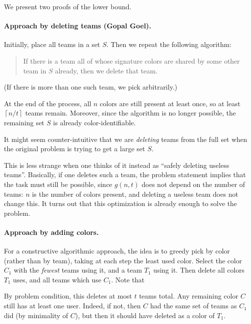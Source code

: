 \documentclass[11pt]{scrartcl}
\begin{document}
We present two proofs of the lower bound.

\paragraph{Approach by deleting teams (Gopal Goel).}
Initially, place all teams in a set $S$.
Then we repeat the following algorithm:
\begin{quote}
If there is a team all of whose signature colors
are shared by some other team in $S$ already,
then we delete that team.
\end{quote}
(If there is more than one such team, we pick arbitrarily.)

At the end of the process,
all $n$ colors are still present at least once,
so at least $\left\lceil n/t \right\rceil$ teams remain.
Moreover, since the algorithm is no longer possible,
the remaining set $S$ is already color-identifiable.

\begin{remark*}
  It might seem counter-intuitive
  that we are \emph{deleting} teams from the full set
  when the original problem is trying to get a large set $S$.

  This is less strange when one thinks
  of it instead as ``safely deleting useless teams''.
  Basically, if one deletes such a team,
  the problem statement implies that the task must still be possible,
  since $g(n,t)$ does not depend on the number of teams:
  $n$ is the number of colors present,
  and deleting a useless team does not change this.
  It turns out that this optimization is already enough to solve the problem.
\end{remark*}

\paragraph{Approach by adding colors.}
For a constructive algorithmic approach,
the idea is to greedy pick by color (rather than by team),
taking at each step the least used color.
Select the color $C_1$ with the \emph{fewest} teams using it,
and a team $T_1$ using it.
Then delete all colors $T_1$ uses, and all teams which use $C_1$.
Note that
\begin{itemize}
  \ii By problem condition,
  this deletes at most $t$ teams total.
  \ii Any remaining color $C$ still has at least one user.
  Indeed, if not, then $C$ had the same set of teams
  as $C_1$ did (by minimality of $C$),
  but then it should have deleted as a color of $T_1$.
\end{itemize}
\end{document}
